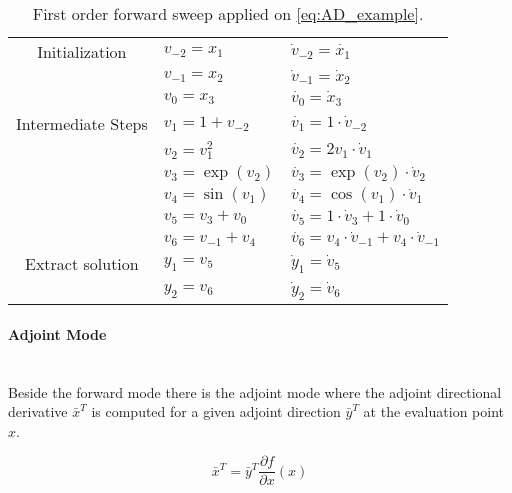 \documentclass{scrartcl}[12pt, halfparskip]
\begin{document}
\begin{table}[H]
\centering
\begin{tabular}{| c | l | l |} \hline
	Initialization & $v_{-2} = x_1$ & $\dot{v}_{-2} = \dot{x_1}$ \\
	& $v_{-1} = x_2$ & $\dot{v}_{-1} = \dot{x}_2$ \\
	& $v_{0} = x_3$ & $\dot{v_{0}} = \dot{x}_3$ \\ \hline
	Intermediate Steps & $v_1 = 1+v_{-2}$ & $\dot{v_1} = 1 \cdot \dot{v}_{-2}$ \\
	& $v_2 = v_{1}^2$ & $\dot{v_2} = 2 v_1 \cdot \dot{v}_{1}$ \\
    & $v_3 = \exp(v_{2})$ & $\dot{v_3} = \exp(v_2) \cdot \dot{v}_{2}$ \\
    & $v_4 = \sin(v_{1})$ & $\dot{v_4} = \cos(v_1) \cdot \dot{v}_{1}$ \\
	& $v_{5} = v_3 + v_0$ & $\dot{v_{5}} = 1 \cdot \dot{v}_3 + 1 \cdot \dot{v}_0$ \\
	& $v_{6} = v_{-1} + v_4$ & $\dot{v_{6}} = v_4 \cdot \dot{v}_{-1} + v_4 \cdot \dot{v}_{-1}$ \\ \hline
	Extract  solution & $y_1 = v_5$ & $\dot{y}_1 = \dot{v}_5$ \\
	& $y_2 = v_6$ & $\dot{y}_2 = \dot{v}_6$ \\ \hline
\end{tabular}
\caption{First order forward sweep applied on \eqref{eq:AD_example}.}
\end{table}




\paragraph{Adjoint Mode}\mbox{}\\
Beside the forward mode there is the adjoint mode where the adjoint directional derivative $\bar{x}^T$ is computed for a given adjoint direction $\bar{y}^T$ at the evaluation point $x$. 

\begin{equation}
	\bar{x}^T = \bar{y}^T \frac{\partial f}{\partial x}(x)
\end{equation}
\end{document}
